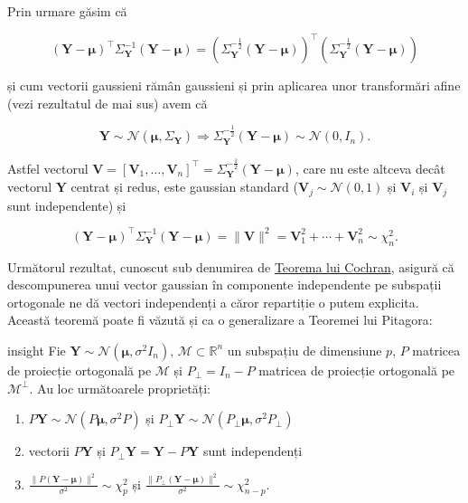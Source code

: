 \documentclass[]{article}
\newenvironment{frshaded_insight*}{%
  \def\FrameCommand{\fboxrule=\FrameRule\fboxsep=\FrameSep \fcolorbox{framecolor_insight}{shadecolor_insight}}%
  \MakeFramed {\advance\hsize-\width \FrameRestore}}%
{\endMakeFramed}
\newenvironment{rmdblock_insight}[1]
  {\begin{frshaded_insight*}
  \begin{itemize}
  \renewcommand{\labelitemi}{
    \raisebox{-.7\height}[0pt][0pt]{
      {\setkeys{Gin}{width=2em,keepaspectratio}\texttt{[image: images/icons/\#1]}}
    }
  }
  \item
  }
  {
  \end{itemize}
  \end{frshaded_insight*}
  }
\newenvironment{rmdinsight}
  {\begin{rmdblock_insight}{insight}}
  {\end{rmdblock_insight}}
\begin{document}
Prin urmare găsim că

\[
(\boldsymbol Y - \boldsymbol \mu)^\intercal \Sigma_{\boldsymbol Y}^{-1}(\boldsymbol Y - \boldsymbol \mu) = \left(\Sigma_{\boldsymbol Y}^{-\frac{1}{2}}(\boldsymbol Y - \boldsymbol \mu)\right)^\intercal\left(\Sigma_{\boldsymbol Y}^{-\frac{1}{2}}(\boldsymbol Y - \boldsymbol \mu)\right) 
\]

și cum vectorii gaussieni rămân gaussieni și prin aplicarea unor
transformări afine (vezi rezultatul de mai sus) avem că

\[
\boldsymbol Y \sim\mathcal{N}(\boldsymbol\mu, \Sigma_{\boldsymbol Y}) \Longrightarrow \Sigma_{\boldsymbol Y}^{-\frac{1}{2}}(\boldsymbol Y - \boldsymbol \mu) \sim\mathcal{N}(0, I_n).
\]

Astfel vectorul
\(\boldsymbol V = [\boldsymbol V_1,\ldots,\boldsymbol V_n]^\intercal = \Sigma_{\boldsymbol Y}^{-\frac{1}{2}}(\boldsymbol Y - \boldsymbol \mu)\),
care nu este altceva decât vectorul \(\boldsymbol Y\) centrat și redus,
este gaussian standard (\(\boldsymbol V_j\sim\mathcal{N}(0,1)\) și
\(\boldsymbol V_i\) și \(\boldsymbol V_j\) sunt independente) și

\[
(\boldsymbol Y - \boldsymbol \mu)^\intercal \Sigma_{\boldsymbol Y}^{-1}(\boldsymbol Y - \boldsymbol \mu) = \lVert \boldsymbol V\rVert^2 = \boldsymbol V_1^2 + \cdots + \boldsymbol V_n^2\sim\chi^2_n.
\]

Următorul rezultat, cunoscut sub denumirea de
\href{https://en.wikipedia.org/wiki/Cochran\%27s_theorem}{Teorema lui
Cochran}, asigură că descompunerea unui vector gaussian în componente
independente pe subspații ortogonale ne dă vectori independenți a căror
repartiție o putem explicita. Această teoremă poate fi văzută și ca o
generalizare a Teoremei lui Pitagora:

\begin{rmdinsight}
Fie \(\boldsymbol Y \sim\mathcal{N}(\boldsymbol\mu, \sigma^2 I_n)\),
\(\mathcal{M}\subset\mathbb{R}^n\) un subspațiu de dimensiune \(p\),
\(P\) matricea de proiecție ortogonală pe \(\mathcal{M}\) și
\(P_\perp = I_n - P\) matricea de proiecție ortogonală pe
\(\mathcal{M}^\perp\). Au loc următoarele proprietăți:

\begin{enumerate}
.{enumi{enumi}.}
\item
  \(P\boldsymbol Y\sim\mathcal{N}(P\boldsymbol\mu, \sigma^2 P)\) și
  \(P_\perp\boldsymbol Y\sim\mathcal{N}(P_\perp\boldsymbol\mu, \sigma^2 P_\perp)\)
\item
  vectorii \(P\boldsymbol Y\) și
  \(P_\perp\boldsymbol Y = \boldsymbol Y - P\boldsymbol Y\) sunt
  independenți
\item
  \(\frac{\lVert P(\boldsymbol Y - \boldsymbol\mu)\rVert^2}{\sigma^2}\sim\chi_p^2\)
  și
  \(\frac{\lVert P_\perp(\boldsymbol Y - \boldsymbol\mu)\rVert^2}{\sigma^2}\sim\chi_{n-p}^2\).
\end{enumerate}
\end{rmdinsight}
\end{document}
